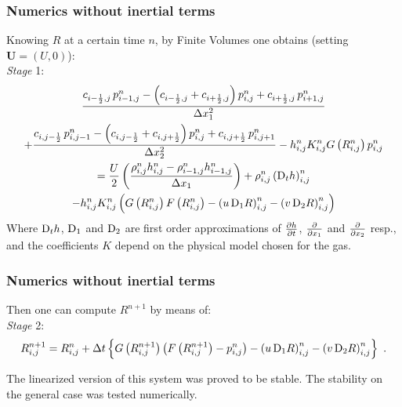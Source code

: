 \documentclass[10pt,aspectratio=169]{beamer}
\begin{document}
\begin{frame}\frametitle{Numerics without inertial terms}\vspace*{0.5cm}
Knowing $R$ at a certain time $n$, by Finite Volumes one obtains (setting $\mathbf{U}=(U,0)$):\\
\bigskip
\emph{Stage} 1:
\begin{multline}
\frac{c_{i-\frac{1}{2},j}\,p^n_{i-1,j}-\left(c_{i-\frac{1}{2},j}+c_{i+\frac{1}{2},j}\right)p^n_{i,j}+c_{i+\frac{1}{2},j}\,p^n_{i+1,j}}{\Delta x_1^2} \\ 
+\frac{c_{i,j-\frac{1}{2}}\,p^n_{i,j-1}-\left(c_{i,j-\frac{1}{2}}+c_{i,j+\frac{1}{2}}\right)p^n_{i,j}+c_{i,j+\frac{1}{2}}\,p^n_{i,j+1}}{\Delta x_2^2} -h_{i,j}^nK^n_{i,j} G\left(R^n_{i,j}\right) p_{i,j}^n
\\= \frac{U}{2}\left(\frac{\rho^n_{i,j}h^n_{i,j}-\rho^n_{i-1,j}h^n_{i-1,j}}{\Delta x_1}\right)+\rho^n_{i,j}\left(\textnormal{D}_th\right)^n_{i,j}\\- h^n_{i,j}K^{n}_{i,j}\left(G\left(R_{i,j}^n\right)F\left(R_{i,j}^n\right)-\left(u\,\textnormal{D}_1R\right)^{n}_{i,j}-\left(v\,\textnormal{D}_2R\right)^{n}_{i,j}\right)
\end{multline}
Where $\textnormal{D}_th$, $\textnormal{D}_1$ and $\textnormal{D}_2$ are first order approximations of $\frac{\partial h}{\partial t}$, $\frac{\partial }{\partial x_1}$ and $\frac{\partial }{\partial x_2}$ resp., and the coefficients $K$ depend on the physical model chosen for the gas.
\end{frame}


\begin{frame}\frametitle{Numerics without inertial terms}
Then one can compute $R^{n+1}$ by means of:\\
\bigskip
\emph{Stage} 2:
\begin{equation}
R_{i,j}^{n+1}=R_{i,j}^{n}+\Delta t \left\{G\left(R_{i,j}^{n+1}\right)\left(F\left(R_{i,j}^{n+1}\right)-p^{n}_{i,j}\right)-\left(u\,\textnormal{D}_1R\right)^{n}_{i,j}-\left(v\,\textnormal{D}_2R\right)^{n}_{i,j}\right\}~.\label{eq:ch6:rp-discrete}
\end{equation}

The linearized version of this system was proved to be stable. The stability on the general case was tested numerically.

\end{frame}

\end{document}
